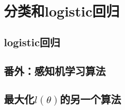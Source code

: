\section{分类和logistic回归}

\subsection{logistic回归}

\subsection{番外：感知机学习算法}

\subsection{最大化$l(\theta)$的另一个算法}

